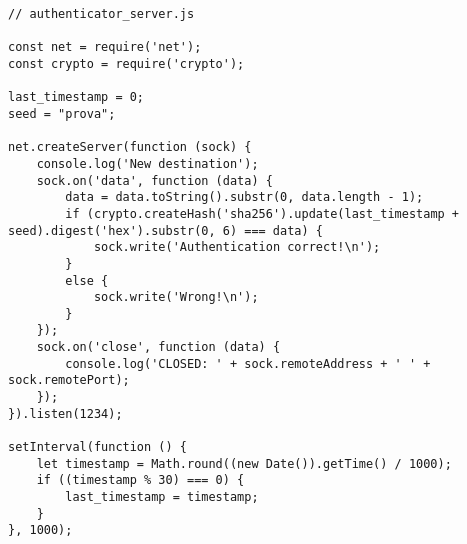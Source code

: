 \begin{lstlisting}[style=JavaScript]
// authenticator_server.js

const net = require('net');
const crypto = require('crypto');

last_timestamp = 0;
seed = "prova";

net.createServer(function (sock) {
    console.log('New destination');
    sock.on('data', function (data) {
        data = data.toString().substr(0, data.length - 1);
        if (crypto.createHash('sha256').update(last_timestamp + seed).digest('hex').substr(0, 6) === data) {
            sock.write('Authentication correct!\n');
        }
        else {
            sock.write('Wrong!\n');
        }
    });
    sock.on('close', function (data) {
        console.log('CLOSED: ' + sock.remoteAddress + ' ' + sock.remotePort);
    });
}).listen(1234);

setInterval(function () {
    let timestamp = Math.round((new Date()).getTime() / 1000);
    if ((timestamp % 30) === 0) {
        last_timestamp = timestamp;
    }
}, 1000);
\end{lstlisting}
